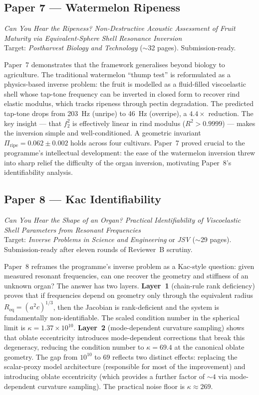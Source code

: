 \documentclass[11pt,a4paper]{article}
\begin{document}
\subsection{Paper 7 --- Watermelon Ripeness}

\emph{Can You Hear the Ripeness? Non-Destructive Acoustic Assessment of Fruit Maturity via Equivalent-Sphere Shell Resonance Inversion}\\
Target: \emph{Postharvest Biology and Technology} ($\sim$32 pages). Submission-ready.

Paper~7 demonstrates that the framework generalises beyond biology to agriculture. The traditional watermelon ``thump test'' is reformulated as a physics-based inverse problem: the fruit is modelled as a fluid-filled viscoelastic shell whose tap-tone frequency can be inverted in closed form to recover rind elastic modulus, which tracks ripeness through pectin degradation. The predicted tap-tone drops from \SI{203}{\Hz} (unripe) to \SI{46}{\Hz} (overripe), a $4.4\times$ reduction. The key insight --- that $f_2^2$ is effectively linear in rind modulus ($R^2 > 0.9999$) --- makes the inversion simple and well-conditioned. A geometric invariant $\Pi_\mathrm{ripe} = 0.062 \pm 0.002$ holds across four cultivars. Paper~7 proved crucial to the programme's intellectual development: the ease of the watermelon inversion threw into sharp relief the difficulty of the organ inversion, motivating Paper~8's identifiability analysis.

\subsection{Paper 8 --- Kac Identifiability}

\emph{Can You Hear the Shape of an Organ? Practical Identifiability of Viscoelastic Shell Parameters from Resonant Frequencies}\\
Target: \emph{Inverse Problems in Science and Engineering} or \emph{JSV} ($\sim$29 pages). Submission-ready after eleven rounds of Reviewer~B scrutiny.

Paper~8 reframes the programme's inverse problem as a Kac-style question: given measured resonant frequencies, can one recover the geometry and stiffness of an unknown organ? The answer has two layers. \textbf{Layer~1} (chain-rule rank deficiency) proves that if frequencies depend on geometry only through the equivalent radius $R_\mathrm{eq} = (a^2 c)^{1/3}$, then the Jacobian is rank-deficient and the system is fundamentally non-identifiable. The scaled condition number in the spherical limit is $\kappa = 1.37 \times 10^{10}$. \textbf{Layer~2} (mode-dependent curvature sampling) shows that oblate eccentricity introduces mode-dependent corrections that break this degeneracy, reducing the condition number to $\kappa = 69.4$ at the canonical oblate geometry. The gap from $10^{10}$ to $69$ reflects two distinct effects: replacing the scalar-proxy model architecture (responsible for most of the improvement) and introducing oblate eccentricity (which provides a further factor of $\sim 4$ via mode-dependent curvature sampling). The practical noise floor is $\kappa \approx 269$.
\end{document}
